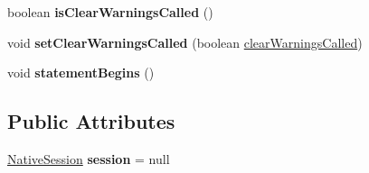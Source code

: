 \begin{DoxyCompactItemize}
\item 
\mbox{\label{classcom_1_1mysql_1_1cj_1_1_abstract_query_a27bdd1ed787ed128edbbd307731e8120}} 
boolean {\bfseries is\+Clear\+Warnings\+Called} ()
\item 
\mbox{\label{classcom_1_1mysql_1_1cj_1_1_abstract_query_a3a7177c2aad4e5a75cb3cbb556c05961}} 
void {\bfseries set\+Clear\+Warnings\+Called} (boolean \mbox{\hyperlink{classcom_1_1mysql_1_1cj_1_1_abstract_query_ad74a8ec76b857307a4271c7078454b8c}{clear\+Warnings\+Called}})
\item 
\mbox{\label{classcom_1_1mysql_1_1cj_1_1_abstract_query_ad497079522b832383db2916bcef4a74c}} 
void {\bfseries statement\+Begins} ()
\end{DoxyCompactItemize}
\subsection*{Public Attributes}
\begin{DoxyCompactItemize}
\item 
\mbox{\label{classcom_1_1mysql_1_1cj_1_1_abstract_query_ad3cd7870c1da389d1e671d1af30aa6b4}} 
\mbox{\hyperlink{classcom_1_1mysql_1_1cj_1_1_native_session}{Native\+Session}} {\bfseries session} = null
\end{DoxyCompactItemize}
